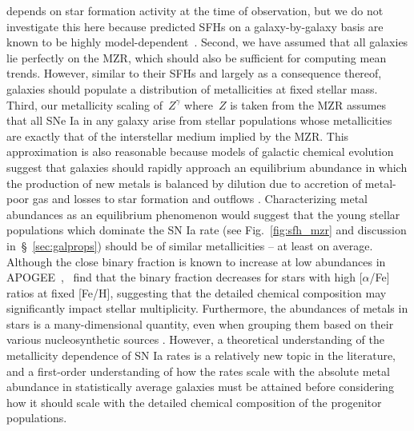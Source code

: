 \documentclass[ms.tex]{subfiles}
\begin{document}
depends on star formation activity at the time of observation, but we do not
investigate this here because predicted SFHs on a galaxy-by-galaxy basis are
known to be highly model-dependent~\citep[e.g.][]{Li2020, Hu2022}.
Second, we have assumed that all galaxies lie perfectly on the MZR, which
should also be sufficient for computing mean trends.
However, similar to their SFHs and largely as a consequence thereof, galaxies
should populate a distribution of metallicities at fixed stellar mass.
Third, our metallicity scaling of~$Z^\gamma$ where~$Z$ is taken from the
\citet{Zahid2014} MZR assumes that all SNe Ia in any galaxy arise from stellar
populations whose metallicities are exactly that of the interstellar
medium implied by the MZR.
This approximation is also reasonable because models of galactic chemical
evolution suggest that galaxies should rapidly approach an equilibrium
abundance in which the production of new metals is balanced by dilution due to
accretion of metal-poor gas and losses to star formation and outflows
\citep{Larson1972, Weinberg2017}.
Characterizing metal abundances as an equilibrium phenomenon would suggest that
the young stellar populations which dominate the SN Ia rate (see
Fig.~\ref{fig:sfh_mzr} and discussion in~\S~\ref{sec:galprops}) should be of
similar metallicities -- at least on average.
Although the close binary fraction is known to increase at low abundances
in APOGEE~\citep{Badenes2018, Moe2019},~\citet{Mazzola2020} find that the
binary fraction decreases for stars with high [$\alpha$/Fe] ratios at fixed
[Fe/H], suggesting that the detailed chemical composition may significantly
impact stellar multiplicity.
Furthermore, the abundances of metals in stars is a many-dimensional quantity,
even when grouping them based on their various nucleosynthetic sources
\citep{Ting2022}.
However, a theoretical understanding of the metallicity dependence of SN Ia
rates is a relatively new topic in the literature, and a first-order
understanding of how the rates scale with the absolute metal abundance in
statistically average galaxies must be attained before considering how it
should scale with the detailed chemical composition of the progenitor
populations.
\end{document}
